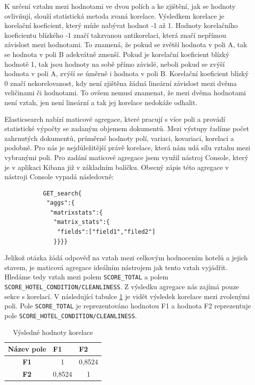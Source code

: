 \documentclass[czech,BP]{thesiskiv}
\begin{document}
K určení vztahu mezi hodnotami ve dvou polích a ke zjištění, jak se hodnoty ovlivňují, slouží statistická metoda zvaná korelace. Výsledkem korelace je korelační koeficient, který může nabývat hodnot -1 až 1. Hodnoty korelačního koeficientu blízkého -1 značí takzvanou antikorelaci, která značí nepřímou závislost mezi hodnotami. To znamená, že pokud se zvětší hodnota v poli A, tak se hodnota v poli B adekvátně zmenší. Pokud je korelační koeficient blízký hodnotě 1, tak jsou hodnoty na sobě přímo závislé, neboli pokud se zvýší hodnota v poli A, zvýší se úměrně i hodnota v poli B. Korelační koeficient blízký 0 značí nekorelovanost, kdy není zjištěna žádná lineární závislost mezi dvěma veličinami či hodnotami. To ovšem nemusí znamenat, že mezi dvěma hodnotami není vztah, jen není lineární a tak jej korelace nedokáže odhalit.\cite{Korelace}


Elasticsearch nabízí maticové agregace, které pracují s více poli a provádí statistické výpočty se zadaným objemem dokumentů. Mezi výstupy řadíme počet zahrnutých dokumentů, průměrné hodnoty polí, variaci, kovariaci, korelaci a podobně. Pro nás je nejdůležitější právě korelace, která nám udá sílu vztahu mezi vybranými poli.\cite{MatrixAggs}
Pro zadání maticové agregace jsem využil nástroj Console, který je v aplikaci Kibana již v základním balíčku. Obecný zápis této agregace v nástroji Console vypadá následovně:


\begin{lstlisting}
	       GET_search{
	        "aggs":{
	         "matrixstats":{
	          "matrix_stats":{
	           "fields":["field1","filed2"]
	          }}}}
\end{lstlisting}


Jelikož otázka žádá odpověď na vztah mezi celkovým hodnocením hotelů a jejich stavem, je maticová agregace ideálním nástrojem jak tento vztah vyjádřit. Hledáme tedy vztah mezi polem \texttt{SCORE\_TOTAL}  a polem \texttt{SCORE\_HO\-TEL\_CONDITION/CLEANLINESS}. Z výsledku agregace nás zajímá pouze sekce s korelací. V následující tabulce \ref{my-label} je vidět výsledek korelace mezi zvolenými poli. Pole \texttt{SCORE\_TOTAL} je reprezentováno hodnotou F1 a hodnota F2 reprezentuje pole \texttt{SCORE\_HO\-TEL\_CONDITION/CLEANLINESS}.

\begin{table}[h]
	\centering
	
	\begin{tabular}{c|c c}
		\hline
		\multicolumn{1}{l|}{\textbf{Název pole}} & \multicolumn{1}{l}{\textbf{F1}} & \multicolumn{1}{l}{\textbf{F2}} \\ \hline
		\textbf{F1} & 1 & 0,8524 \\ 
		\textbf{F2} & 0,8524 & 1 \\ \hline
	\end{tabular}
\caption{Výsledné hodnoty korelace}
\label{my-label}
\end{table}
\end{document}
